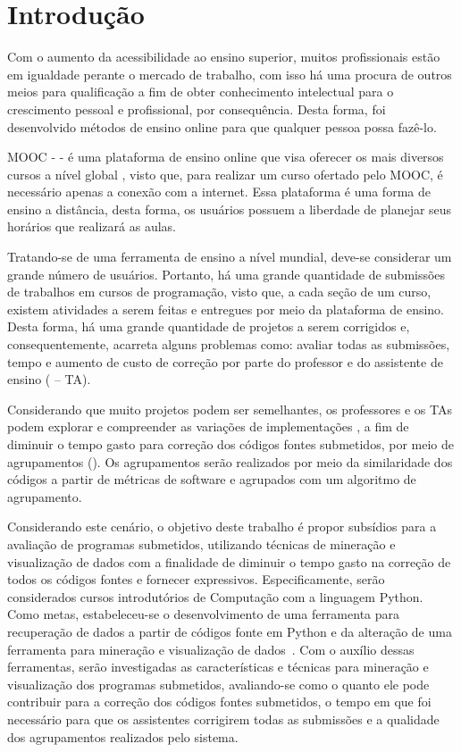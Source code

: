 \chapter{Introdução}
Com o aumento da acessibilidade ao ensino superior, muitos profissionais estão em
igualdade perante o mercado de trabalho, com isso há uma procura de outros meios
para qualificação a fim de obter conhecimento intelectual para o crescimento
pessoal e profissional, por consequência. Desta forma, foi desenvolvido métodos
de ensino online para que qualquer pessoa possa fazê-lo.

MOOC -  - é uma plataforma de ensino online
que visa oferecer os mais diversos cursos a nível global \cite{Mehlenbacher:2012},
visto que, para realizar um curso ofertado pelo MOOC, é necessário apenas a conexão
com a internet. Essa plataforma é uma forma de ensino a distância, desta forma,
os usuários possuem a liberdade de planejar seus horários que realizará as aulas. 

Tratando-se de uma ferramenta de ensino a nível mundial, deve-se considerar um
grande número de usuários. Portanto, há uma grande quantidade de submissões de
trabalhos em cursos de programação, visto que, a cada seção de um curso, existem
atividades a serem feitas e entregues por meio da plataforma de ensino. Desta
forma, há uma grande quantidade de projetos a serem corrigidos e, consequentemente,
acarreta alguns problemas como: avaliar todas as submissões, tempo e aumento de
custo de correção por parte do professor e do assistente de ensino
( – TA).



Considerando que muito projetos podem ser semelhantes, os professores e os TAs
podem explorar e compreender as variações de implementações \cite{Yin:2015}, a
fim de diminuir o tempo gasto para correção dos códigos fontes submetidos, por
meio de agrupamentos (). Os agrupamentos serão realizados por
meio da similaridade dos códigos a partir de métricas de software e agrupados
com um algoritmo de agrupamento.

Considerando este cenário, o objetivo deste trabalho é propor subsídios para a
avaliação de programas submetidos, utilizando técnicas de mineração e visualização
de dados com a finalidade de diminuir o tempo gasto na correção de todos os códigos
fontes e  fornecer  expressivos. Especificamente, serão
considerados cursos introdutórios de Computação com a linguagem Python. Como
metas, estabeleceu-se o desenvolvimento de uma ferramenta para recuperação de
dados a partir de códigos fonte em Python e da alteração de uma ferramenta para
mineração e visualização de dados~\cite{Alencar}. Com o auxílio dessas ferramentas,
serão investigadas as características e técnicas para mineração e visualização
dos programas submetidos, avaliando-se como o quanto ele pode contribuir para
a correção dos códigos fontes submetidos, o tempo em que foi necessário para
que os assistentes corrigirem todas as submissões e a qualidade dos agrupamentos
realizados pelo sistema.

